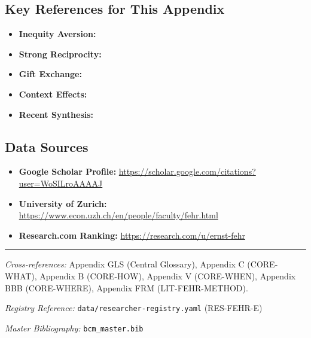 \subsection{Key References for This Appendix}

\begin{itemize}[nosep]
    \item \textbf{Inequity Aversion:} \citet{fehr1999theory}
    \item \textbf{Strong Reciprocity:} \citet{fehr2002strong, fehr2002altruistic}
    \item \textbf{Gift Exchange:} \citet{fehr1993fairness, fehr1998reciprocity}
    \item \textbf{Context Effects:} \citet{cohn2014business, cohn2015evidence}
    \item \textbf{Recent Synthesis:} \citet{fehr2025social}
\end{itemize}

\subsection{Data Sources}

\begin{itemize}[nosep]
    \item \textbf{Google Scholar Profile:} \url{https://scholar.google.com/citations?user=WoSILroAAAAJ}
    \item \textbf{University of Zurich:} \url{https://www.econ.uzh.ch/en/people/faculty/fehr.html}
    \item \textbf{Research.com Ranking:} \url{https://research.com/u/ernst-fehr}
\end{itemize}



\vspace{1em}
\hrule
\vspace{0.5em}

\noindent\textit{Cross-references:}
Appendix GLS (Central Glossary),
Appendix C (CORE-WHAT),
Appendix B (CORE-HOW),
Appendix V (CORE-WHEN),
Appendix BBB (CORE-WHERE),
Appendix FRM (LIT-FEHR-METHOD).

\noindent\textit{Registry Reference:} \texttt{data/researcher-registry.yaml} (RES-FEHR-E)

\noindent\textit{Master Bibliography:} \texttt{bcm\_master.bib}

